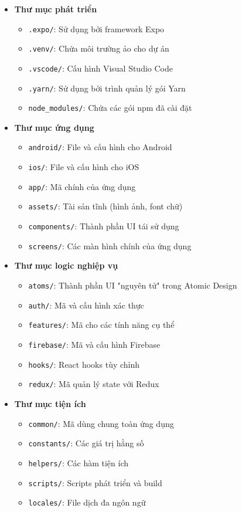 \documentclass[a4paper]{report}
\begin{document}
\begin{itemize}
    \item \textbf{Thư mục phát triển}
    \begin{itemize}
        \item \texttt{.expo/}: Sử dụng bởi framework Expo
        \item \texttt{.venv/}: Chứa môi trường ảo cho dự án
        \item \texttt{.vscode/}: Cấu hình Visual Studio Code
        \item \texttt{.yarn/}: Sử dụng bởi trình quản lý gói Yarn
        \item \texttt{node\_modules/}: Chứa các gói npm đã cài đặt
    \end{itemize}

    \item \textbf{Thư mục ứng dụng}
    \begin{itemize}
        \item \texttt{android/}: File và cấu hình cho Android
        \item \texttt{ios/}: File và cấu hình cho iOS
        \item \texttt{app/}: Mã chính của ứng dụng
        \item \texttt{assets/}: Tài sản tĩnh (hình ảnh, font chữ)
        \item \texttt{components/}: Thành phần UI tái sử dụng
        \item \texttt{screens/}: Các màn hình chính của ứng dụng
    \end{itemize}

    \item \textbf{Thư mục logic nghiệp vụ}
    \begin{itemize}
        \item \texttt{atoms/}: Thành phần UI "nguyên tử" trong Atomic Design
        \item \texttt{auth/}: Mã và cấu hình xác thực
        \item \texttt{features/}: Mã cho các tính năng cụ thể
        \item \texttt{firebase/}: Mã và cấu hình Firebase
        \item \texttt{hooks/}: React hooks tùy chỉnh
        \item \texttt{redux/}: Mã quản lý state với Redux
    \end{itemize}

    \item \textbf{Thư mục tiện ích}
    \begin{itemize}
        \item \texttt{common/}: Mã dùng chung toàn ứng dụng
        \item \texttt{constants/}: Các giá trị hằng số
        \item \texttt{helpers/}: Các hàm tiện ích
        \item \texttt{scripts/}: Scripts phát triển và build
        \item \texttt{locales/}: File dịch đa ngôn ngữ
    \end{itemize}
\end{itemize}
\end{document}
